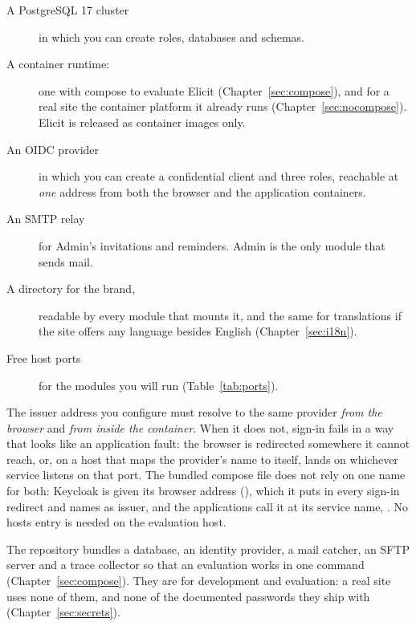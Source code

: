 \documentclass[11pt, a4paper]{article}
\begin{document}
\begin{description}
  \item[A PostgreSQL 17 cluster] in which you can create roles, databases and schemas.
  \item[A container runtime:] one with compose to evaluate Elicit
        (Chapter~\ref{sec:compose}), and for a real site the container platform it already
        runs (Chapter~\ref{sec:nocompose}).
        Elicit is released as container images only.
  \item[An OIDC provider] in which you can create a confidential client and three roles,
        reachable at \emph{one} address from both the browser and the application containers.
  \item[An SMTP relay] for Admin's invitations and reminders. Admin is the only module that
        sends mail.
  \item[A directory for the brand,] readable by every module that mounts it, and the same for
        translations if the site offers any language besides English (Chapter~\ref{sec:i18n}).
  \item[Free host ports] for the modules you will run (Table~\ref{tab:ports}).
\end{description}

\begin{elicitcaution}
The issuer address you configure must resolve to the same provider \emph{from the browser}
and \emph{from inside the container}. When it does not, sign-in fails in a way that looks
like an application fault: the browser is redirected somewhere it cannot reach, or, on a host
that maps the provider's name to itself, lands on whichever service listens on that port. The
bundled compose file does not rely on one name for both: Keycloak is given its browser address
(), which it puts in every sign-in redirect and
names as issuer, and the applications call it at its service name,
. No hosts entry is needed on the evaluation host.
\end{elicitcaution}

The repository bundles a database, an identity provider, a mail catcher, an SFTP server and a
trace collector so that an evaluation works in one command (Chapter~\ref{sec:compose}). They
are for development and evaluation: a real site uses none of them, and none of the documented
passwords they ship with (Chapter~\ref{sec:secrets}).

\end{document}
